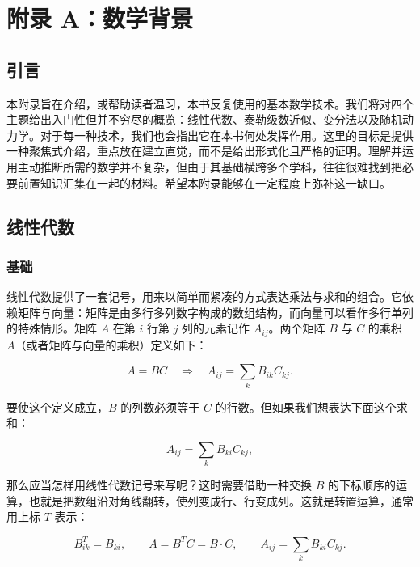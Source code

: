 \chapter{附录 A：数学背景}
\section{引言}

本附录旨在介绍，或帮助读者温习，本书反复使用的基本数学技术。我们将对四个主题给出入门性但并不穷尽的概览：线性代数、泰勒级数近似、变分法以及随机动力学。对于每一种技术，我们也会指出它在本书何处发挥作用。这里的目标是提供一种聚焦式介绍，重点放在建立直觉，而不是给出形式化且严格的证明。理解并运用主动推断所需的数学并不复杂，但由于其基础横跨多个学科，往往很难找到把必要前置知识汇集在一起的材料。希望本附录能够在一定程度上弥补这一缺口。

\section{线性代数}

\subsection{基础}

线性代数提供了一套记号，用来以简单而紧凑的方式表达乘法与求和的组合。它依赖矩阵与向量：矩阵是由多行多列数字构成的数组结构，而向量可以看作多行单列的特殊情形。矩阵 $A$ 在第 $i$ 行第 $j$ 列的元素记作 $A_{ij}$。两个矩阵 $B$ 与 $C$ 的乘积 $A$（或者矩阵与向量的乘积）定义如下：

\begin{equation}
A = BC
\quad\Rightarrow\quad
A_{ij} = \sum_k B_{ik} C_{kj}.
\tag{A.1}
\end{equation}

要使这个定义成立，$B$ 的列数必须等于 $C$ 的行数。但如果我们想表达下面这个求和：

\begin{equation}
A_{ij} = \sum_k B_{ki} C_{kj},
\tag{A.2}
\end{equation}

那么应当怎样用线性代数记号来写呢？这时需要借助一种交换 $B$ 的下标顺序的运算，也就是把数组沿对角线翻转，使列变成行、行变成列。这就是转置运算，通常用上标 $T$ 表示：

\begin{equation}
B^T_{ik} = B_{ki},
\qquad
A = B^T C = B \cdot C,
\qquad
A_{ij} = \sum_k B_{ki} C_{kj}.
\tag{A.3}
\end{equation}

